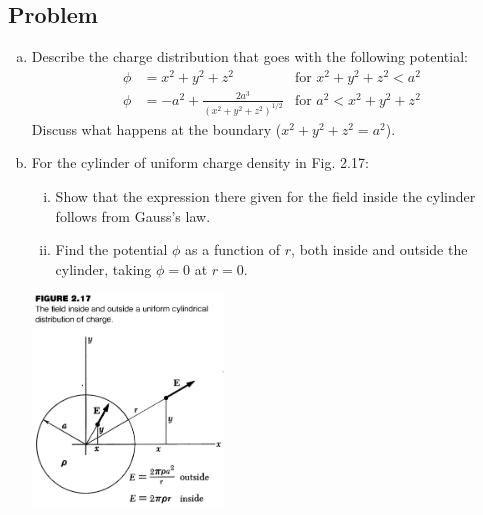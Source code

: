 \documentclass[solutions]{esg8022pset}
\begin{document}
\subsection{Problem}
  \begin{enumerate}[(a)]
    \item Describe the charge distribution that goes with the following potential:
      \begin{align*}
        \phi & = x^2 + y^2 + z^2 & \text{for }x^2 + y^2 + z^2 < a^2 \\
        \phi & = -a^2 + \frac{2a^3}{(x^2 + y^2 + z^2)^{1/2}} & \text{for }a^2 < x^2 + y^2 + z^2
      \end{align*}
      Discuss what happens at the boundary ($x^2 + y^2 + z^2 = a^2$).
    \item For the cylinder of uniform charge density in Fig. 2.17:
      \begin{enumerate}[(i)]
        \item Show that the expression there given for the field inside the cylinder follows from Gauss's law.
        \item Find the potential $\phi$ as a function of $r$, both inside and outside the cylinder, taking $\phi = 0$ at $r = 0$.
      \end{enumerate}
      \begin{center}\includegraphics[width=0.4\textwidth]{ps02_2}\end{center}
  \end{enumerate}
\end{document}
